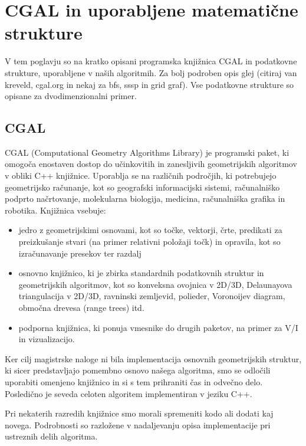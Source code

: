\documentclass[a4paper, 12pt]{book}
\newcommand{\clearemptydoublepage}{\newpage{\pagestyle{empty}\cleardoublepage}}
\begin{document}
\clearemptydoublepage


\chapter{CGAL in uporabljene matematične strukture}
\label{ch1}

V tem poglavju so na kratko opisani programska knjižnica CGAL in podatkovne strukture, uporabljene v naših algoritmih. Za bolj podroben opis glej (citiraj van kreveld, cgal.org in nekaj za bfs, sssp in grid graf). Vse podatkovne strukture so opisane za dvodimenzionalni primer.
\section{CGAL}
CGAL (Computational Geometry Algorithms Library) je programski paket, ki omogoča enostaven dostop do učinkovitih in zanesljivih geometrijskih algoritmov v obliki C++ knjižnice. Uporablja se na različnih področjih, ki potrebujejo geometrijsko računanje, kot so geografski informacijski sistemi, računalniško podprto načrtovanje, molekularna biologija, medicina, računalniška grafika in robotika. Knjižnica vsebuje:

\begin{itemize}
\item jedro z geometrijskimi osnovami, kot so točke, vektorji, črte, predikati za preizkušanje stvari (na primer relativni položaji točk) in opravila, kot so izračunavanje presekov ter razdalj
\item osnovno knjižnico, ki je zbirka standardnih podatkovnih struktur in geometrijskih algoritmov, kot so konveksna ovojnica v 2D/3D, Delaunayova triangulacija v 2D/3D, ravninski zemljevid, polieder, Voronoijev diagram, območna drevesa (range trees) itd.
\item podporna knjižnica, ki ponuja vmesnike do drugih paketov, na primer za V/I in vizualizacijo. 
\end{itemize}

Ker cilj magistrske naloge ni bila implementacija osnovnih geometrijskih struktur, ki sicer predstavljajo pomembno osnovo našega algoritma, smo se odločili uporabiti omenjeno knjižnico in si s tem prihraniti čas in odvečno delo. Posledično je seveda celoten algoritem implementiran v jeziku C++.

Pri nekaterih razredih knjižnice smo morali spremeniti kodo ali dodati kaj novega. Podrobnosti so razložene v nadaljevanju opisa implementacije pri ustreznih delih algoritma.
\end{document}
